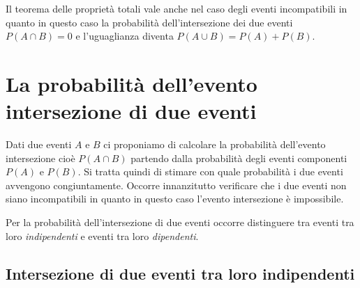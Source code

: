 \osservazione Il teorema delle proprietà totali vale anche nel caso degli 
eventi 
incompatibili in quanto in questo caso la probabilità dell'intersezione dei 
due 
eventi $P(A\cap B)=0$ e l'uguaglianza diventa $P(A\cup B)=P(A)+P(B)$.


\section{La probabilità dell'evento intersezione di due eventi}
\label{sec:04_intersezione}

Dati due eventi $A$ e $B$ ci proponiamo di calcolare la probabilità 
dell'evento intersezione cioè $P(A\cap B)$ partendo dalla probabilità degli 
eventi componenti $ P(A) $ e $ P(B) $. Si tratta quindi di stimare con quale 
probabilità i due eventi avvengono congiuntamente. Occorre innanzitutto 
verificare che i due eventi non siano incompatibili in quanto in questo caso 
l'evento intersezione è impossibile.

Per la probabilità dell'intersezione di due eventi occorre distinguere tra 
eventi tra loro \emph{indipendenti} e eventi tra loro \emph{dipendenti}.

\subsection{Intersezione di due eventi tra loro indipendenti}


